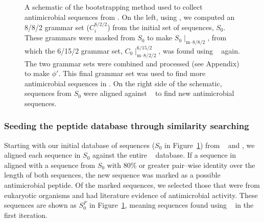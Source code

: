 \begin{figure}[ptb]
        \caption[Schematic of the bootstrapping method.]{
            A schematic of the bootstrapping
            method used to collect
            antimicrobial sequences from \sptr
            .  On the left, using \Teiresias,
            we computed an 8/8/2 grammar set
            ($C_i^{8/2/2}$) from the initial
            set of sequences, $S_0$.  These
            grammars were masked from $S_0$
            to make $S_0\mid_{\textrm{m--}8/8/2}$,
            from which the 6/15/2 grammar set,
            $C_0\mid_{\textrm{m--}8/2/2}^{6/15/2}$,
            was found using \Teiresias~ again.
            The two grammar sets were combined
            and processed (see Appendix)
            to make $\phi'$.  This final
            grammar set was used to find more
            antimicrobial sequences in \sptr.
            On the right side of the schematic,
            sequences from $S_0$ were aligned
            against \sptr~ to find new
            antimicrobial sequences.
        }
        \label{fig:bootstrapping}
        \end{figure}


        \subsubsection{Seeding the peptide database
            through similarity searching}
            Starting with our initial
            database of sequences ($S_0$ in
            Figure~\ref{fig:bootstrapping})
            from \sptr~ and \amsdb, we aligned
            each sequence in $S_0$ against
            the entire \sptr~ database.  If a
            sequence in \sptr~ aligned with
            a sequence from $S_0$ with 80\%
            or greater pair--wise identity
            over the length of both sequences,
            the new sequence was marked as a
            possible antimicrobial peptide.
            Of the marked sequences,
            we selected those that were
            from eukaryotic organisms and
            had literature evidence of
            antimicrobial activity.  These
            sequences are shown as $S_0^F$ in
            Figure~\ref{fig:bootstrapping},
            meaning sequences found using
            \Fasta~ in the first iteration.

